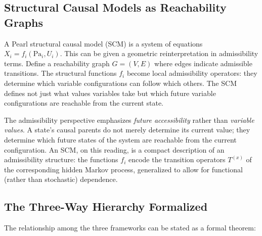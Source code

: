 \documentclass[12pt, a4paper]{article}
\theoremstyle{plain}
\theoremstyle{definition}
\theoremstyle{remark}
\begin{document}
\subsection{Structural Causal Models as Reachability Graphs}

A Pearl structural causal model (SCM) is a system of equations
$X_i = f_i(\mathrm{Pa}_i, U_i)$. This can be given a geometric reinterpretation
in admissibility terms. Define a reachability graph $G = (V, E)$ where edges
indicate admissible transitions. The structural functions $f_i$ become local
admissibility operators: they determine which variable configurations can
follow which others. The SCM defines not just what values variables take but
which future variable configurations are reachable from the current state.

The admissibility perspective emphasizes \emph{future accessibility} rather
than \emph{variable values}. A state's causal parents do not merely determine
its current value; they determine which future states of the system are
reachable from the current configuration. An SCM, on this reading, is a
compact description of an admissibility structure: the functions $f_i$ encode
the transition operators $T^{(x)}$ of the corresponding hidden Markov process,
generalized to allow for functional (rather than stochastic) dependence.

\subsection{The Three-Way Hierarchy Formalized}

The relationship among the three frameworks can be stated as a formal
theorem:
\end{document}
